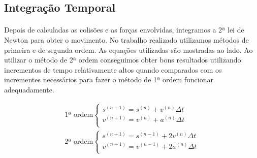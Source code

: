 \documentclass[a0,portrait]{a0poster}
\begin{document}
\begin{multicols}{2}
\subsection*{Integração Temporal}
\vspace{-1cm}
\begin{minipage}{0.25\textwidth}
\paragraph{}Depois de calculadas as colisões e as forças envolvidas, integramos
a 2ª lei de Newton para obter o movimento. No trabalho realizado
utilizamos métodos de primeira e de segunda ordem. As equações utilizadas são
mostradas ao lado. Ao utilizar o método de 2ª ordem conseguimos obter bons
resultados utilizando incrementos de tempo relativamente altos quando
comparados com os incrementes necessários para fazer o método de 1ª ordem
funcionar adequadamente.
\end{minipage}
\begin{minipage}{0.25\textwidth}
\begin{center}\vspace{3cm}
	\begin{displaymath}
	    \begin{array}{l}
		    \mbox{1ª ordem}	
			    \left\{
				      \begin{array}{l}
				      s^{(n+1)} = s^{(n)} + v^{(n)} \Delta t  
					\\
				      v^{(n+1)} = v^{(n)} + a^{(n)} \Delta t  
					  \\
				      \end{array}
			  \right. 
		  \\
		      \mbox{2ª ordem}
			    \left\{
				      \begin{array}{l}
				      s^{(n+1)} = s^{(n-1)} + 2 v^{(n)} \Delta t
 					\\
				      v^{(n+1)} = v^{(n-1)} + 2 a^{(n)} \Delta t
 				      \\
				      \end{array}
			      \right.
	    \end{array}
		\end{displaymath}		
\end{center}\vspace{1cm}
\end{minipage}

\vspace{-2cm}

\end{multicols}
\end{document}
